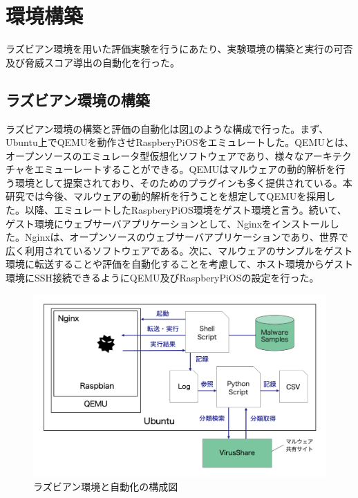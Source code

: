 \documentclass[12pt,a4paper,titlepage,report]{jsbook}
\begin{document}
\section{環境構築}
\label{環境構築}
ラズビアン環境を用いた評価実験を行うにあたり、実験環境の構築と実行の可否及び脅威スコア導出の自動化を行った。

\subsection{ラズビアン環境の構築}
ラズビアン環境の構築と評価の自動化は図\ref{fig:exparch}のような構成で行った。まず、Ubuntu上でQEMUを動作させRaspberyPiOSをエミュレートした。QEMUとは、オープンソースのエミュレータ型仮想化ソフトウェアであり、様々なアーキテクチャをエミューレートすることができる。QEMUはマルウェアの動的解析を行う環境として提案されており、そのためのプラグイン\cite{panda}も多く提供されている。本研究では今後、マルウェアの動的解析を行うことを想定してQEMUを採用した。以降、エミュレートしたRaspberyPiOS環境をゲスト環境と言う。続いて、ゲスト環境にウェブサーバアプリケーションとして、Nginxをインストールした。Nginxは、オープンソースのウェブサーバアプリケーションであり、世界で広く利用されているソフトウェアである。次に、マルウェアのサンプルをゲスト環境に転送することや評価を自動化することを考慮して、ホスト環境からゲスト環境にSSH接続できるようにQEMU及びRaspberyPiOSの設定を行った。

\begin{figure}[htbp]
	\begin{center}
		\includegraphics[width=13cm]{img/exparch.png}
		\caption{ラズビアン環境と自動化の構成図}
		\label{fig:exparch}
	\end{center}
\end{figure}
\end{document}
